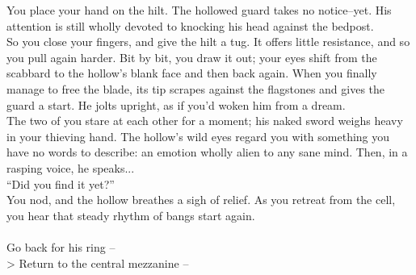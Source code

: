 You place your hand on the hilt. The hollowed guard takes no notice--yet. His attention is still wholly devoted to knocking his head against the bedpost.\\

So you close your fingers, and give the hilt a tug. It offers little resistance, and so you pull again harder. Bit by bit, you draw it out; your eyes shift from the scabbard to the hollow’s blank face and then back again. When you finally manage to free the blade, its tip scrapes against the flagstones and gives the guard a start. He jolts upright, as if you’d woken him from a dream.\\

The two of you stare at each other for a moment; his naked sword weighs heavy in your thieving hand. The hollow’s wild eyes regard you with something you have no words to describe: an emotion wholly alien to any sane mind. Then, in a rasping voice, he speaks...\\

“Did you find it yet?”\\

You nod, and the hollow breathes a sigh of relief. As you retreat from the cell, you hear that steady rhythm of bangs start again.\\
\\

 Go back for his ring -- \\
> Return to the central mezzanine -- 